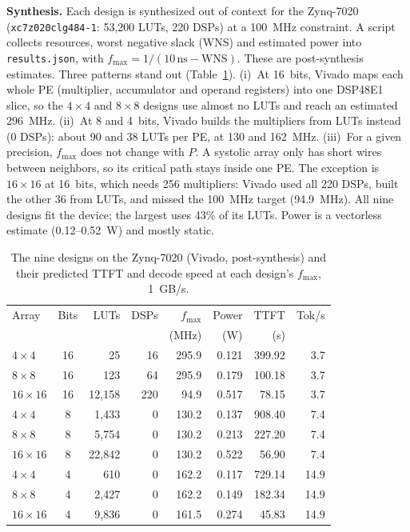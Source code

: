 \textbf{Synthesis.} Each design is synthesized out of context for the
Zynq-7020 (\texttt{xc7z020clg484-1}: 53{,}200 LUTs, 220 DSPs) at a 100~MHz
constraint. A script collects resources, worst negative slack (WNS) and
estimated power into \texttt{results.json}, with
$f_{\max} = 1/(10\,\text{ns} - \text{WNS})$. These are post-synthesis
estimates. Three patterns stand out (Table~\ref{tab:designs}).
(i)~At 16~bits, Vivado maps each whole PE (multiplier, accumulator and operand
registers) into one DSP48E1 slice, so the $4\times4$ and $8\times8$ designs
use almost no LUTs and reach an estimated 296~MHz.
(ii)~At 8 and 4~bits, Vivado builds the multipliers from LUTs instead
(0 DSPs): about 90 and 38 LUTs per PE, at 130 and 162~MHz.
(iii)~For a given precision, $f_{\max}$ does not change with $P$. A systolic
array only has short wires between neighbors, so its critical path stays
inside one PE. The exception is $16\times16$ at 16~bits, which needs 256
multipliers: Vivado used all 220 DSPs, built the other 36 from LUTs, and missed
the 100~MHz target (94.9~MHz). All nine designs fit the device; the largest
uses 43\% of its LUTs. Power is a vectorless estimate (0.12--0.52~W) and
mostly static.

\begin{table}[t]
\centering
\small
\setlength{\tabcolsep}{3.5pt}
\caption{The nine designs on the Zynq-7020 (Vivado, post-synthesis) and their predicted TTFT and decode speed at each design's $f_{\max}$, 1~GB/s.}
\label{tab:designs}
\begin{tabular}{l c r r r r r r}
\hline
Array & Bits & LUTs & DSPs & $f_{\max}$ & Power & TTFT & Tok/s \\
      &      &      &      & (MHz)      & (W)   & (s)  &       \\
\hline
$4\times4$ & 16 & 25 & 16 & 295.9 & 0.121 & 399.92 & 3.7 \\
$8\times8$ & 16 & 123 & 64 & 295.9 & 0.179 & 100.18 & 3.7 \\
$16\times16$ & 16 & 12,158 & 220 & 94.9 & 0.517 & 78.15 & 3.7 \\
$4\times4$ & 8 & 1,433 & 0 & 130.2 & 0.137 & 908.40 & 7.4 \\
$8\times8$ & 8 & 5,754 & 0 & 130.2 & 0.213 & 227.20 & 7.4 \\
$16\times16$ & 8 & 22,842 & 0 & 130.2 & 0.522 & 56.90 & 7.4 \\
$4\times4$ & 4 & 610 & 0 & 162.2 & 0.117 & 729.14 & 14.9 \\
$8\times8$ & 4 & 2,427 & 0 & 162.2 & 0.149 & 182.34 & 14.9 \\
$16\times16$ & 4 & 9,836 & 0 & 161.5 & 0.274 & 45.83 & 14.9 \\
\hline
\end{tabular}
\end{table}

